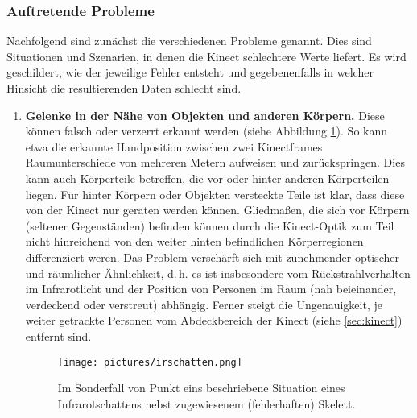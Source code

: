 	\subsubsection{Auftretende Probleme}\label{sec:rob1}
	Nachfolgend sind zunächst die verschiedenen Probleme genannt. Dies sind Situationen und Szenarien, in denen die Kinect schlechtere Werte liefert. Es wird geschildert, wie der jeweilige Fehler entsteht und gegebenenfalls in welcher Hinsicht die resultierenden Daten schlecht sind.
	\begin{enumerate}[label=(\roman*)]
	\begin{figure}[H]
\texttt{[image: pictures/sensors-16-01965-g006.jpg]}
\caption{Diverse falsch erkannte Skelette: degenerierte Skelette (a), verschmolzene Skelette (b) und Skelettverlust bei Überdeckung (c). Quelle: \cite{bodyprop}}
\label{fig:fehlerk}
\end{figure}
		\item\label{itm:problem1} \textbf{Gelenke in der Nähe von Objekten und anderen Körpern.} Diese können falsch oder verzerrt erkannt werden (siehe Abbildung \ref{fig:fehlerk}). So kann etwa die erkannte Handposition zwischen zwei Kinectframes Raumunterschiede von mehreren Metern aufweisen und zurückspringen. Dies kann auch Körperteile betreffen, die vor oder hinter anderen Körperteilen liegen. Für hinter Körpern oder Objekten versteckte Teile ist klar, dass diese von der Kinect nur geraten werden können. Gliedmaßen, die sich vor Körpern (seltener Gegenständen) befinden können durch die Kinect-Optik zum Teil nicht hinreichend von den weiter hinten befindlichen Körperregionen differenziert weren. Das Problem verschärft sich mit zunehmender optischer und räumlicher Ähnlichkeit, d.\,h. es ist insbesondere vom Rückstrahlverhalten im Infrarotlicht und der Position von Personen im Raum (nah beieinander, verdeckend oder verstreut) abhängig. Ferner steigt die Ungenauigkeit, je weiter getrackte Personen vom \glqq Abdeckbereich\grqq{} der Kinect (siehe \ref{sec:kinect}) entfernt sind.\par
\par 
	\begin{figure}[H]
	\centering
	\texttt{[image: pictures/irschatten.png]}
	\caption{Im Sonderfall von Punkt eins beschriebene Situation eines Infrarotschattens nebst zugewiesenem (fehlerhaften) Skelett.}\label{fig:irsch}
	\end{figure}

\end{enumerate}
